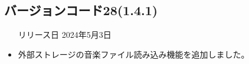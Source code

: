\subsection*{バージョンコード28(1.4.1)}
\begin{itemize}
    \item[リリース日] 2024年5月3日
\end{itemize}

\new
\begin{itemize}
    \item 外部ストレージの音楽ファイル読み込み機能を追加しました。
\end{itemize}

\change

\fix

